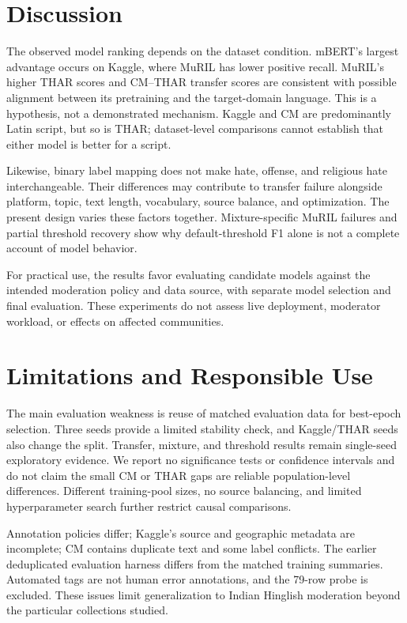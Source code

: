 \documentclass[11pt,a4paper]{article}
\begin{document}
\section{Discussion}
The observed model ranking depends on the dataset condition. mBERT's
largest advantage occurs on Kaggle, where MuRIL has lower positive
recall. MuRIL's higher THAR scores and CM--THAR transfer scores are
consistent with possible alignment between its pretraining and the
target-domain language. This is a hypothesis, not a demonstrated mechanism.
Kaggle and CM are predominantly Latin script, but so is THAR; dataset-level
comparisons cannot establish that either model is better for a script.

Likewise, binary label mapping does not make hate, offense, and religious
hate interchangeable. Their differences may contribute to transfer
failure alongside platform, topic, text length, vocabulary, source balance,
and optimization. The present design varies these factors together.
Mixture-specific MuRIL failures and partial threshold recovery show why
default-threshold F1 alone is not a complete account of model behavior.

For practical use, the results favor evaluating candidate models against
the intended moderation policy and data source, with separate model
selection and final evaluation. These experiments do not assess live
deployment, moderator workload, or effects on affected communities.

\section{Limitations and Responsible Use}
The main evaluation weakness is reuse of matched evaluation data for
best-epoch selection. Three seeds provide a limited stability check,
and Kaggle/THAR seeds also change the split. Transfer, mixture, and
threshold results remain single-seed exploratory evidence. We report
no significance tests or confidence intervals and do not claim the small
CM or THAR gaps are reliable population-level differences. Different
training-pool sizes, no source balancing, and limited hyperparameter
search further restrict causal comparisons.

Annotation policies differ; Kaggle's source and geographic metadata are
incomplete; CM contains duplicate text and some label conflicts. The
earlier deduplicated evaluation harness differs from the matched training
summaries. Automated tags are not human error annotations, and the
79-row probe is excluded. These issues limit generalization to Indian
Hinglish moderation beyond the particular collections studied.
\end{document}
